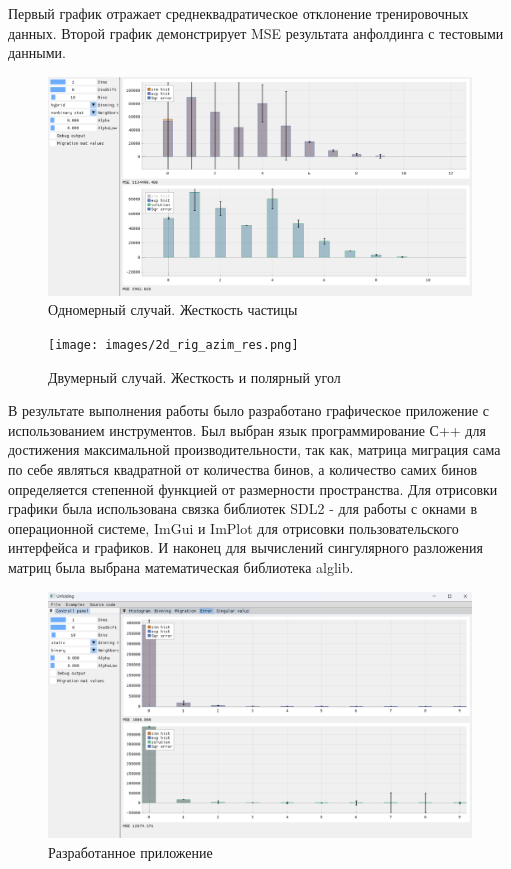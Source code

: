 \documentclass[a4paper,12pt]{diplom}
\begin{document}
Первый график отражает среднеквадратическое отклонение тренировочных данных. 
Второй график демонстрирует MSE результата анфолдинга с тестовыми данными.

\begin{figure}[h!]
   \centering
   \includegraphics[width=\linewidth]{images/1d_rig_res.png}
   \caption{Одномерный случай. Жесткость частицы}
\end{figure}

\begin{figure}[h!]
   \centering
   \texttt{[image: images/2d\_rig\_azim\_res.png]}
   \caption{Двумерный случай. Жесткость и полярный угол}
\end{figure}



В результате выполнения работы было разработано графическое приложение с использованием инструментов. Был выбран язык программирование С++ для 
достижения максимальной производительности, так как, матрица миграция сама по себе являться квадратной от количества бинов, а количество самих 
бинов определяется степенной функцией от размерности пространства. Для отрисовки графики была использована связка библиотек SDL2 - для работы с 
окнами в операционной системе, ImGui и ImPlot для отрисовки пользовательского интерфейса и графиков. И наконец для вычислений сингулярного 
разложения матриц была выбрана математическая библиотека alglib.

\begin{figure}[h!]
   \centering
   \includegraphics[width=\linewidth]{images/app_example.png}
   \caption{Разработанное приложение}
\end{figure}
\end{document}
